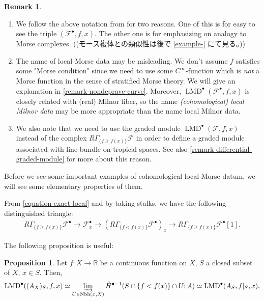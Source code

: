 \documentclass[a4paper,dvipdfmx,reqno,12pt]{amsart}
\theoremstyle{definition}
\newtheorem{proposition}[theorem]{Proposition}
\newtheorem{remark}[theorem]{Remark}
\newcommand{\mcal}[1]{\mathcal{#1}}%
\newcommand{\opn}[1]{\operatorname{#1}}
\numberwithin{equation}{section}
\begin{document}
\begin{remark}
\begin{enumerate}
\item We follow the above notation from 
\cite[p.271]{MR2031639} for two reasons.
One of this is for easy to see the triple 
$(\mcal{F}^{\bullet},f,x)$. 
The other one is for emphasizing on analogy to
Morse complexes.
((モース複体との類似性は後で \cref{example-} にて見る。))
\item The name of local Morse data may be misleading.
We don't assume $f$ satisfies some 
"Morse condition" since
 we need to use some $C^{\infty}$-function
which is \emph{not} a Morse function in the sense of 
stratified Morse theory. 
We will give an explanation in 
\cref{remark-nondeprave-curve}.
Moreover, 
$\opn{LMD}^{\bullet}(\mathcal{F}^{\bullet},f,x)$
is closely related with (real) Milnor fiber, so
the name \emph{(cohomological) local Milnor data} may 
be more appropriate 
than the name local Milnor data. 
\item We also note that we need to use 
the graded module $\opn{LMD}^{\bullet}(\mcal{F},f,x)$ instead of 
the complex $R\Gamma_{\{f\geq f(x)\}}\mathcal{F}$ in order to define
a graded module associated with line bundle on tropical
spaces. See also \cref{remark-differential-graded-module} for more about 
this reason.
\end{enumerate}
\end{remark}

Before we see some important examples of cohomological
local Morse datum, we will see some elementary
properties of them.

From \cref{equation-exact-local} and by taking stalks,
we have the following distinguished triangle:
\begin{align}
R\Gamma_{\{f\geq f(x)\}}\mathcal{F}^{\bullet} \to 
\mathcal{F}_x^{\bullet}\to 
(R\Gamma_{\{f<f(x)\}}\mathcal{F}^{\bullet})_x\to 
R\Gamma_{\{f\geq f(x)\}}\mathcal{F}^{\bullet}[1].
\end{align}



The following proposition is useful:

\begin{proposition} \label{prop-local-morse-data}
Let $f\colon X\to \mathbb{R}$ be a continuous function
on $X$, $S$ a closed subset
of $X$, $x\in S$. Then,
\begin{align} 
\opn{LMD}^{\bullet}((A_{X})_S,f,x
) \simeq \varinjlim_{U\in\opn{Nbh}(x,X)} 
\tilde{H}^{\bullet-1}(S\cap \{f<f(x)\}\cap U;A) 
\simeq \opn{LMD}^{\bullet}(A_S,f|_S,x).
\end{align}

\end{proposition}
\end{document}
